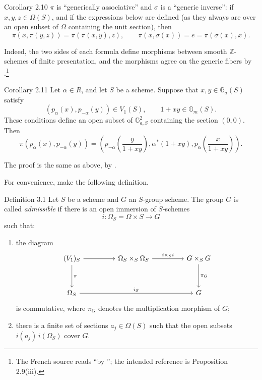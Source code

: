 \begin{sgastatement}{Corollary 2.10}
\(\pi\) is ``generically associative'' and \(\sigma\) is a ``generic
inverse'': if \(x,y,z\in\Omega(S)\), and if the expressions below are
defined (as they always are over an open subset of \(\Omega\) containing
the unit section), then
\[
 \pi(x,\pi(y,z))=\pi(\pi(x,y),z),\qquad
 \pi(x,\sigma(x))=e=\pi(\sigma(x),x).
\]
\end{sgastatement}

Indeed, the two sides of each formula define morphisms between smooth
\(\mathbb Z\)-schemes of finite presentation, and the morphisms agree on
the generic fibers by .\footnote{The French source reads
``by ''; the intended reference is Proposition 2.9(iii).}

\begin{sgastatement}{Corollary 2.11}
Let \(\alpha\in R\), and let \(S\) be a scheme. Suppose that
\(x,y\in\mathbb G_a(S)\) satisfy
\[
 (p_\alpha(x),p_{-\alpha}(y))\in V_1(S),
 \qquad 1+xy\in\mathbb G_m(S).
\]
These conditions define an open subset of \(\mathbb G_{a,S}^2\)
containing the section \((0,0)\). Then
\[
 \pi(p_\alpha(x),p_{-\alpha}(y))
 =
 \left(
 p_{-\alpha}\!\left(\frac{y}{1+xy}\right),
 \alpha^\ast(1+xy),
 p_\alpha\!\left(\frac{x}{1+xy}\right)
 \right).
\]
\end{sgastatement}

The proof is the same as above, by .


For convenience, make the following definition.

\begin{sgastatement}{Definition 3.1}
Let \(S\) be a scheme and \(G\) an \(S\)-group scheme. The group \(G\)
is called \emph{admissible} if there is an open immersion of
\(S\)-schemes
\[
 i\colon\Omega_S=\Omega\times S\longrightarrow G
\]
such that:
\begin{enumerate}[label=\textup{(\roman*)},leftmargin=2.2em]
\item the diagram
\[
\begin{tikzcd}[column sep=4.5em,row sep=3.2em]
(V_1)_S
  \arrow[r]
  \arrow[d,"\pi"]
&
\Omega_S\times_S\Omega_S
  \arrow[r,"i\times_S i"]
&
G\times_SG
  \arrow[d,"\pi_G"]
\\
\Omega_S
  \arrow[rr,"i_S"]
&&
G
\end{tikzcd}
\]
is commutative, where \(\pi_G\) denotes the multiplication morphism
of \(G\);
\item there is a finite set of sections \(a_j\in\Omega(S)\) such that
the open subsets \(i(a_j)\,i(\Omega_S)\) cover \(G\).
\end{enumerate}
\end{sgastatement}

